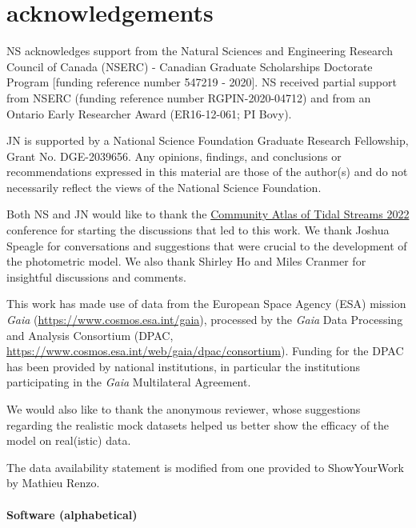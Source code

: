 \documentclass[twocolumn, linenumbers]{aastex631}
\newcommand{\dataarchive}[1]{\textit{#1}}
\newcommand{\Gaia}{\dataarchive{Gaia}}
\begin{document}


\newpage
\section{acknowledgements}

    NS acknowledges support from the Natural Sciences and Engineering Research
    Council of Canada (NSERC) - Canadian Graduate Scholarships Doctorate Program
    [funding reference number 547219 - 2020].  NS received partial support from
    NSERC (funding reference number RGPIN-2020-04712) and from an Ontario Early
    Researcher Award (ER16-12-061; PI Bovy).

    JN is supported by a National Science Foundation Graduate Research
    Fellowship, Grant No. DGE-2039656. Any opinions, findings, and conclusions
    or recommendations expressed in this material are those of the author(s) and
    do not necessarily reflect the views of the National Science Foundation.
    
    Both NS and JN would like to thank the
    \href{https://stellarstreams.org/streams22/}{Community Atlas of Tidal
    Streams 2022} conference for starting the discussions that led to this work.
    We thank Joshua Speagle for conversations and suggestions that were crucial
    to the development of the photometric model. We also thank Shirley Ho and
    Miles Cranmer for insightful discussions and comments.

    This work has made use of data from the European Space Agency (ESA) mission
    \Gaia{} (\url{https://www.cosmos.esa.int/gaia}), processed by the \Gaia{}
    Data Processing and Analysis Consortium (DPAC,
    \url{https://www.cosmos.esa.int/web/gaia/dpac/consortium}). Funding for the
    DPAC has been provided by national institutions, in particular the
    institutions participating in the \Gaia{} Multilateral Agreement.

    We would also like to thank the anonymous reviewer, whose suggestions regarding the realistic mock datasets helped us better show the efficacy of the model on real(istic) data.

    The data availability statement is modified from one provided to
    ShowYourWork by Mathieu Renzo.

    \paragraph{Software (alphabetical)}
\end{document}
